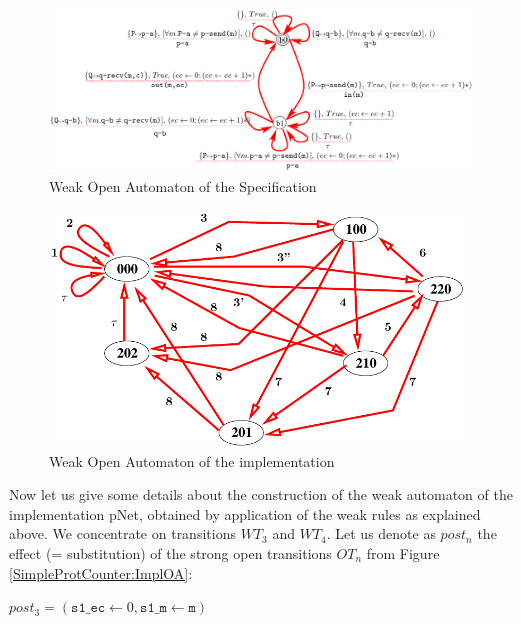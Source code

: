\documentclass{lmcs}
\newcommand{\TODO}[1]{\textcolor{red}{\textbf{[TODO:#1]}}}
\begin{document}
  



\begin{figure}[h]
   \centerline{\includegraphics[width=15cm]{XFIG/SPSpecWeakOpen}}
  \caption{Weak Open Automaton of the Specification}
   \label{SimpleProtCounter:WeakSpecOA}
\end{figure}

\begin{figure}[h]
   \centerline{\includegraphics[width=11cm]{XFIG/SimpleProtImpl-WOA}}
  \caption{Weak Open Automaton of the implementation}
   \label{SimpleProtCounter:ImplWOA}
\end{figure}


Now let us give some details about the construction of the weak automaton of the implementation pNet, obtained by application of the weak rules as explained above. We concentrate on transitions $WT_3$ and $WT_4$. Let us denote as $post_n$ the effect (= substitution) of the strong open transitions $OT_n$ from Figure \ref{SimpleProtCounter:ImplOA}:
\smallskip

$post_3 = (\texttt{s1\_ec}\gets 0, \texttt{s1\_m}\gets \texttt{m})$
\end{document}

